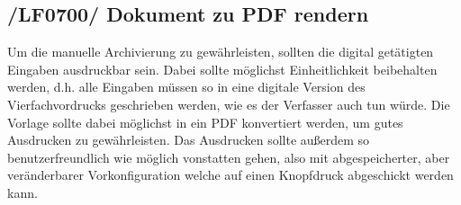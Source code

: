 \subsection{/LF0700/ Dokument zu PDF rendern}
Um die manuelle Archivierung zu gewährleisten, sollten die digital getätigten Eingaben ausdruckbar sein. Dabei sollte möglichst Einheitlichkeit beibehalten werden, d.h. alle Eingaben müssen so in eine digitale Version des Vierfachvordrucks geschrieben werden, wie es der Verfasser auch tun würde. Die Vorlage sollte dabei möglichst in ein PDF konvertiert werden, um gutes Ausdrucken zu gewährleisten. Das Ausdrucken sollte außerdem so benutzerfreundlich wie möglich vonstatten gehen, also mit abgespeicherter, aber veränderbarer Vorkonfiguration welche auf einen Knopfdruck abgeschickt werden kann.